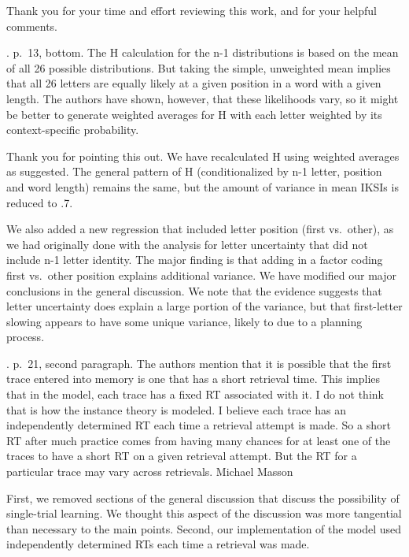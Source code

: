 \documentclass[draft]{article}
\begin{document}
Thank you for your time and effort reviewing this work, and for your helpful comments.

. p.~13, bottom. The H calculation for the n-1 distributions is based on the mean of all 26 possible distributions. But taking the simple, unweighted mean implies that all 26 letters are equally likely at a given position in a word with a given length. The authors have shown, however, that these likelihoods vary, so it might be better to generate weighted averages for H with each letter weighted by its context-specific probability.

Thank you for pointing this out. We have recalculated H using weighted averages as suggested. The general pattern of H (conditionalized by n-1 letter, position and word length) remains the same, but the amount of variance in mean IKSIs is reduced to .7.

We also added a new regression that included letter position (first vs.~other), as we had originally done with the analysis for letter uncertainty that did not include n-1 letter identity. The major finding is that adding in a factor coding first vs.~other position explains additional variance. We have modified our major conclusions in the general discussion. We note that the evidence suggests that letter uncertainty does explain a large portion of the variance, but that first-letter slowing appears to have some unique variance, likely to due to a planning process.

. p.~21, second paragraph. The authors mention that it is possible that the first trace entered into memory is one that has a short retrieval time. This implies that in the model, each trace has a fixed RT associated with it. I do not think that is how the instance theory is modeled. I believe each trace has an independently determined RT each time a retrieval attempt is made. So a short RT after much practice comes from having many chances for at least one of the traces to have a short RT on a given retrieval attempt. But the RT for a particular trace may vary across retrievals. Michael Masson

First, we removed sections of the general discussion that discuss the possibility of single-trial learning. We thought this aspect of the discussion was more tangential than necessary to the main points. Second, our implementation of the model used independently determined RTs each time a retrieval was made.

\setlength{\leftskip}{0.4in}
\setlength{\parindent}{-0.4in}
\end{document}
